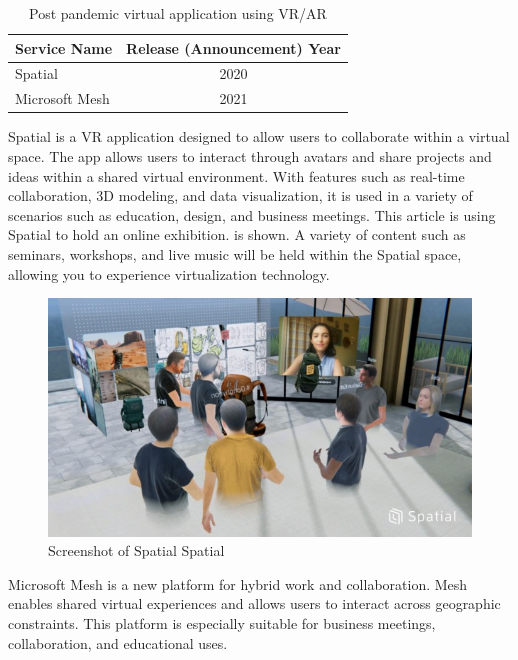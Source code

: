 \documentclass[12pt]{article}
\begin{document}
\begin{table}[h]
    \begin{center}
        \begin{tabular}{|l|c|} \hline
            Service Name   & Release (Announcement) Year \\ \hline
            Spatial        & 2020                        \\
            Microsoft Mesh & 2021                        \\ \hline
        \end{tabular}
        \caption{Post pandemic virtual application using VR/AR}
    \end{center}
\end{table}

Spatial is a VR application designed to allow users to collaborate within a
virtual space. The app allows users to interact through avatars and share
projects and ideas within a shared virtual environment. With features such as
real-time collaboration, 3D modeling, and data visualization, it is used in a
variety of scenarios such as education, design, and business meetings. This
article \cite{ref21} is using Spatial to hold an online exhibition. is shown.
A variety of content
such as seminars, workshops, and live music will be held within the Spatial
space, allowing you to experience virtualization technology.

\begin{figure}[H]
    \centering
    \includegraphics[width=1\textwidth]{spatial.jpg}
    \caption{Screenshot of Spatial \textcopyright Spatial}
    \label{fig:my_label}
\end{figure}

Microsoft Mesh is a new platform for hybrid work and collaboration. Mesh
enables shared virtual experiences and allows users to interact across
geographic constraints. This platform is especially suitable for business
meetings, collaboration, and educational uses.
\end{document}
